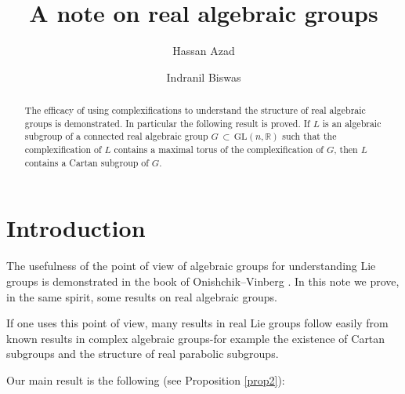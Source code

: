 \documentclass[12pt]{amsart}
\begin{document}
\title[A note on real algebraic groups]{A note on real algebraic groups}

\author[H. Azad]{Hassan Azad}

\address{Department of Mathematics and Statistics, King Fahd University,
Saudi Arabia}


\author[I. Biswas]{Indranil Biswas}

\address{School of Mathematics, Tata Institute of Fundamental Research, Homi
Bhabha Road, Bombay 400005, India}




\date{}

\begin{abstract}
The efficacy of using complexifications to understand the structure of real
algebraic groups is demonstrated. In particular the following result is
proved. If $L$ is an algebraic subgroup of a connected real algebraic group
$G\, \subset\,\mathrm{GL}(n, {\mathbb{R}})$ such that the complexification of
$L$ contains a maximal torus of the complexification of $G$, then $L$
contains a Cartan subgroup of $G$.
\end{abstract}

\maketitle

\baselineskip=15.5pt

\section{Introduction}

The usefulness of the point of view of algebraic groups for understanding
Lie groups is demonstrated in the book of Onishchik--Vinberg \cite{OV}. In
this note we prove, in the same spirit, some results on real algebraic
groups.

If one uses this point of view, many results in real Lie groups follow
easily from known results in complex algebraic groups-for example the
existence of Cartan subgroups and the structure of real parabolic subgroups.

Our main result is the following (see Proposition \ref{prop2}):
\end{document}

